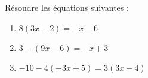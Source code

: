 \documentclass[a4paper,11pt,exos]{nsi} %
\begin{document}
\maketitle




\begin{exercice}
Résoudre les équations suivantes :
\begin{multicols}{3}
	\begin{enumerate}
		\item $8(3x-2)=-x-6$
        \item $3-(9x-6)=-x+3$
		\item $-10-4(-3x+5)=3(3x-4)$
	\end{enumerate}
\end{multicols}

\end{exercice}
\end{document}
